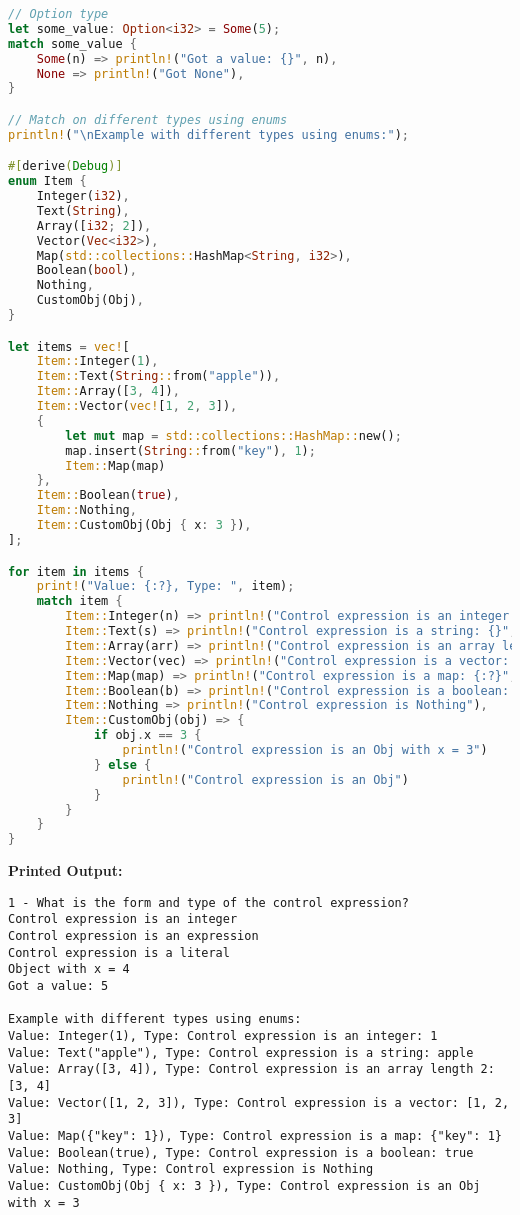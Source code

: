 \documentclass{article}
\begin{document}
\begin{itemize}
\begin{lstlisting}[language=Rust]
// Option type
let some_value: Option<i32> = Some(5);
match some_value {
    Some(n) => println!("Got a value: {}", n),
    None => println!("Got None"),
}

// Match on different types using enums
println!("\nExample with different types using enums:");

#[derive(Debug)]
enum Item {
    Integer(i32),
    Text(String),
    Array([i32; 2]),
    Vector(Vec<i32>),
    Map(std::collections::HashMap<String, i32>),
    Boolean(bool),
    Nothing,
    CustomObj(Obj),
}

let items = vec![
    Item::Integer(1),
    Item::Text(String::from("apple")),
    Item::Array([3, 4]),
    Item::Vector(vec![1, 2, 3]),
    {
        let mut map = std::collections::HashMap::new();
        map.insert(String::from("key"), 1);
        Item::Map(map)
    },
    Item::Boolean(true),
    Item::Nothing,
    Item::CustomObj(Obj { x: 3 }),
];

for item in items {
    print!("Value: {:?}, Type: ", item);
    match item {
        Item::Integer(n) => println!("Control expression is an integer: {}", n),
        Item::Text(s) => println!("Control expression is a string: {}", s),
        Item::Array(arr) => println!("Control expression is an array length 2: {:?}", arr),
        Item::Vector(vec) => println!("Control expression is a vector: {:?}", vec),
        Item::Map(map) => println!("Control expression is a map: {:?}", map),
        Item::Boolean(b) => println!("Control expression is a boolean: {}", b),
        Item::Nothing => println!("Control expression is Nothing"),
        Item::CustomObj(obj) => {
            if obj.x == 3 {
                println!("Control expression is an Obj with x = 3")
            } else {
                println!("Control expression is an Obj")
            }
        }
    }
}
\end{lstlisting}
\textbf{Printed Output:} \begin{verbatim}
1 - What is the form and type of the control expression?
Control expression is an integer
Control expression is an expression
Control expression is a literal
Object with x = 4
Got a value: 5

Example with different types using enums:
Value: Integer(1), Type: Control expression is an integer: 1
Value: Text("apple"), Type: Control expression is a string: apple
Value: Array([3, 4]), Type: Control expression is an array length 2: [3, 4]
Value: Vector([1, 2, 3]), Type: Control expression is a vector: [1, 2, 3]
Value: Map({"key": 1}), Type: Control expression is a map: {"key": 1}
Value: Boolean(true), Type: Control expression is a boolean: true
Value: Nothing, Type: Control expression is Nothing
Value: CustomObj(Obj { x: 3 }), Type: Control expression is an Obj with x = 3
\end{verbatim}


\end{itemize}
\end{document}
